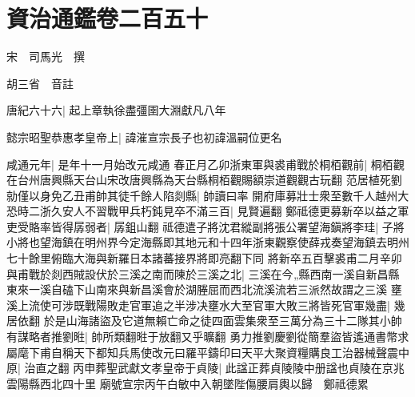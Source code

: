 \chapter{資治通鑑卷二百五十}
宋　司馬光　撰

胡三省　音註

唐紀六十六|{
	起上章執徐盡彊圉大淵獻凡八年}


懿宗昭聖恭惠孝皇帝上|{
	諱漼宣宗長子也初諱溫嗣位更名}


咸通元年|{
	是年十一月始改元咸通}
春正月乙卯浙東軍與裘甫戰於桐栢觀前|{
	桐栢觀在台州唐興縣天台山宋改唐興縣為天台縣桐栢觀賜額崇道觀觀古玩翻}
范居植死劉勍僅以身免乙丑甫帥其徒千餘人陷剡縣|{
	帥讀曰率}
開府庫募壯士衆至數千人越州大恐時二浙久安人不習戰甲兵朽鈍見卒不滿三百|{
	見賢遍翻}
鄭祗德更募新卒以益之軍吏受賂率皆得孱弱者|{
	孱鉏山翻}
祗德遣子將沈君縱副將張公署望海鎭將李珪|{
	子將小將也望海鎮在明州界今定海縣即其地元和十四年浙東觀察使薛戎奏望海鎮去明州七十餘里俯臨大海與新羅日本諸蕃接界將即亮翻下同}
將新卒五百擊裘甫二月辛卯與甫戰於剡西賊設伏於三溪之南而陳於三溪之北|{
	三溪在今縣西南一溪自新昌縣東來一溪自磕下山南來與新昌溪會於湖塍屈而西北流溪流若三派然故謂之三溪}
壅溪上流使可涉既戰陽敗走官軍追之半涉决壅水大至官軍大敗三將皆死官軍幾盡|{
	幾居依翻}
於是山海諸盜及它道無賴亡命之徒四面雲集衆至三萬分為三十二隊其小帥有謀略者推劉暀|{
	帥所類翻暀于放翻又乎曠翻}
勇力推劉慶劉從簡羣盜皆遙通書幣求屬麾下甫自稱天下都知兵馬使改元曰羅平鑄印曰天平大聚資糧購良工治器械聲震中原|{
	治直之翻}
丙申葬聖武獻文孝皇帝于貞陵|{
	此諡正葬貞陵陵中册諡也貞陵在京兆雲陽縣西北四十里}
廟號宣宗丙午白敏中入朝墜陛傷腰肩輿以歸　鄭祗德累

